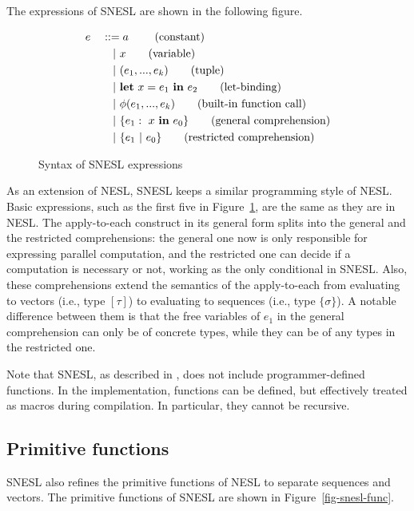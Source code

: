 The expressions of SNESL are shown in the following figure.

\begin{figure}[H]\large 
\begin{alignat*}{2}
& e &&::=  a \     \tag{constant} \\
&   && \quad | \ x  \tag{variable} \\
&   && \quad | \ (e_1,...,e_k) \tag{tuple}\\
&   && \quad | \ \mathbf{let} \ x = e_1 \ \mathbf{in} \ e_2 \tag{let-binding}\\
&   && \quad | \ \phi{(e_1,...,e_k)}  \tag{built-in function call} \\
&   && \quad | \ \{e_1: \ x \ \mathbf{in} \ e_0 \} \tag{general comprehension} \\
&   && \quad | \ \{e_1 \ | \ e_0 \}\tag {restricted comprehension} 
\end{alignat*}
\caption{Syntax of SNESL expressions \label{fig-snesl-exps}}
\end{figure}

As an extension of NESL, SNESL keeps a similar programming style of NESL. 
Basic expressions, such as the first five in Figure~\ref{fig-snesl-exps}, are the same as they are in NESL. 
The apply-to-each construct in its general form splits into the general and the restricted comprehensions:
the general one now is only responsible for expressing parallel computation,
and the restricted one can decide if a computation is necessary or not, working as the only conditional in SNESL.
Also, these comprehensions extend the semantics of the apply-to-each from evaluating to vectors (i.e., type $[\tau]$) to evaluating to sequences (i.e., type $\{\sigma\}$). 
A notable difference between them is that the free variables of $e_1$ in the general comprehension can only be of concrete types, while they can be of any types in the restricted one.

Note that SNESL, as described in \cite{Fphd}, does not include programmer-defined functions. 
In the implementation, functions can be defined, but effectively treated as macros during compilation.
In particular, they cannot be recursive.

\subsection{Primitive functions}

SNESL also refines the primitive functions of NESL to separate sequences and vectors.
The primitive functions of SNESL are shown in Figure~\ref{fig-snesl-func}.

